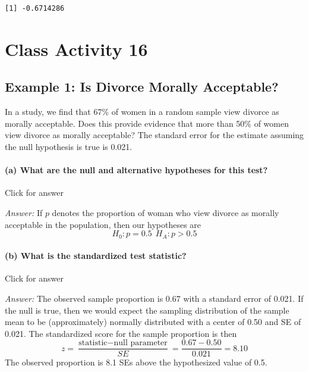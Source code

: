\documentclass[
]{book}
\begin{document}
\begin{verbatim}
[1] -0.6714286
\end{verbatim}

\hypertarget{class-activity-16}{%
\chapter{Class Activity 16}\label{class-activity-16}}

\hypertarget{example-1-is-divorce-morally-acceptable}{%
\section{Example 1: Is Divorce Morally Acceptable?}\label{example-1-is-divorce-morally-acceptable}}

In a study, we find that 67\% of women in a random sample view divorce as morally acceptable. Does this provide evidence that more than 50\% of women view divorce as morally acceptable? The standard error for the estimate assuming the null hypothesis is true is 0.021.

\hypertarget{a-what-are-the-null-and-alternative-hypotheses-for-this-test}{%
\subsubsection{(a) What are the null and alternative hypotheses for this test?}\label{a-what-are-the-null-and-alternative-hypotheses-for-this-test}}

Click for answer

\emph{Answer:} If \(p\) denotes the proportion of woman who view divorce as morally acceptable in the population, then our hypotheses are
\[
H_0: p = 0.5 \ \ H_A: p > 0.5
\]

\hypertarget{b-what-is-the-standardized-test-statistic}{%
\subsubsection{(b) What is the standardized test statistic?}\label{b-what-is-the-standardized-test-statistic}}

Click for answer

\emph{Answer:} The observed sample proportion is 0.67 with a standard error of 0.021. If the null is true, then we would expect the sampling distribution of the sample mean to be (approximately) normally distributed with a center of 0.50 and SE of 0.021. The standardized score for the sample proportion is then
\[
z = \dfrac{\textrm{statistic} - \textrm{null parameter}}{SE} = \dfrac{0.67 - 0.50}{0.021} = 8.10
\]
The observed proportion is 8.1 SEs above the hypothesized value of 0.5.
\end{document}
